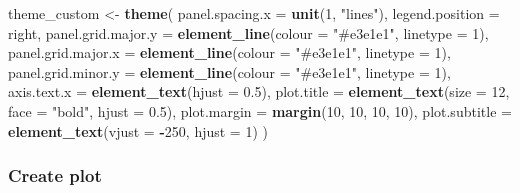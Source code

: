 \documentclass[
]{article}
\newenvironment{Shaded}{\begin{snugshade}}{\end{snugshade}}
\newcommand{\AttributeTok}[1]{\textcolor[rgb]{0.13,0.29,0.53}{#1}}
\newcommand{\DecValTok}[1]{\textcolor[rgb]{0.00,0.00,0.81}{#1}}
\newcommand{\FloatTok}[1]{\textcolor[rgb]{0.00,0.00,0.81}{#1}}
\newcommand{\FunctionTok}[1]{\textcolor[rgb]{0.13,0.29,0.53}{\textbf{#1}}}
\newcommand{\NormalTok}[1]{#1}
\newcommand{\OtherTok}[1]{\textcolor[rgb]{0.56,0.35,0.01}{#1}}
\newcommand{\SpecialCharTok}[1]{\textcolor[rgb]{0.81,0.36,0.00}{\textbf{#1}}}
\newcommand{\StringTok}[1]{\textcolor[rgb]{0.31,0.60,0.02}{#1}}
\begin{document}
\begin{Shaded}
\begin{Highlighting}[]
\NormalTok{theme\_custom }\OtherTok{\textless{}{-}} \FunctionTok{theme}\NormalTok{(}
  \AttributeTok{panel.spacing.x =} \FunctionTok{unit}\NormalTok{(}\DecValTok{1}\NormalTok{, }\StringTok{"lines"}\NormalTok{),}
  \AttributeTok{legend.position =} \StringTok{\textquotesingle{}right\textquotesingle{}}\NormalTok{,}
  \AttributeTok{panel.grid.major.y =} \FunctionTok{element\_line}\NormalTok{(}\AttributeTok{colour =} \StringTok{"\#e3e1e1"}\NormalTok{, }\AttributeTok{linetype =} \DecValTok{1}\NormalTok{),}
  \AttributeTok{panel.grid.major.x =} \FunctionTok{element\_line}\NormalTok{(}\AttributeTok{colour =} \StringTok{"\#e3e1e1"}\NormalTok{, }\AttributeTok{linetype =} \DecValTok{1}\NormalTok{),}
  \AttributeTok{panel.grid.minor.y =} \FunctionTok{element\_line}\NormalTok{(}\AttributeTok{colour =} \StringTok{"\#e3e1e1"}\NormalTok{, }\AttributeTok{linetype =} \DecValTok{1}\NormalTok{),}
  \AttributeTok{axis.text.x =} \FunctionTok{element\_text}\NormalTok{(}\AttributeTok{hjust =} \FloatTok{0.5}\NormalTok{),}
  \AttributeTok{plot.title =} \FunctionTok{element\_text}\NormalTok{(}\AttributeTok{size =} \DecValTok{12}\NormalTok{, }\AttributeTok{face =} \StringTok{"bold"}\NormalTok{, }\AttributeTok{hjust =} \FloatTok{0.5}\NormalTok{),}
  \AttributeTok{plot.margin =} \FunctionTok{margin}\NormalTok{(}\DecValTok{10}\NormalTok{, }\DecValTok{10}\NormalTok{, }\DecValTok{10}\NormalTok{, }\DecValTok{10}\NormalTok{),}
  \AttributeTok{plot.subtitle =} \FunctionTok{element\_text}\NormalTok{(}\AttributeTok{vjust =} \SpecialCharTok{{-}}\DecValTok{250}\NormalTok{, }\AttributeTok{hjust =} \DecValTok{1}\NormalTok{)}
\NormalTok{)}
\end{Highlighting}
\end{Shaded}

\subsubsection{Create plot}\label{create-plot}
\end{document}
